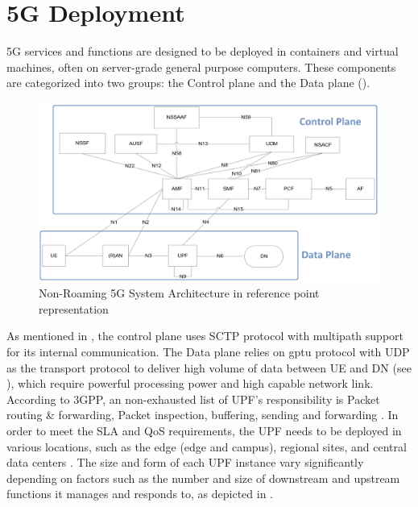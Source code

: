 \section{5G Deployment}
5G services and functions are designed to be deployed in containers and virtual machines, often on server-grade general purpose computers.
These components are categorized into two groups: the Control plane and the Data plane ().

\begin{figure}[H]
	\centering
	\includegraphics[width=1.0\textwidth]{resources/images/Non_Roaming_5G_System_Architecture_in_reference_point_representation.png}
	\caption{Non-Roaming 5G System Architecture in reference point representation \cite{3gpp_5g_system_architect_spec_release_18}}
	\label{fig:related_work:Non_Roaming_5G_System_Architecture_in_reference_point_representation}
\end{figure}

As mentioned in , the control plane uses \ac{SCTP} protocol with multipath support for its internal communication.
The Data plane relies on \ac{gptu} protocol with \ac{UDP} as the transport protocol to deliver high volume of data between \ac{UE} and \ac{DN} (see ), which require powerful processing power and high capable network link.
According to \ac{3GPP}, an non-exhausted list of \ac{UPF}'s responsibility is Packet routing \& forwarding, Packet inspection, buffering, sending and forwarding \cite{3gpp_5g_system_architect_spec_release_18}.
In order to meet the \ac{SLA} and \ac{QoS} requirements, the \ac{UPF} needs to be deployed in various locations, such as the edge (edge and campus), regional sites, and central data centers \cite{zte_upf_full_whitepaper}. 
The size and form of each \ac{UPF} instance vary significantly depending on factors such as the number and size of downstream and upstream functions it manages and responds to, as depicted in .


